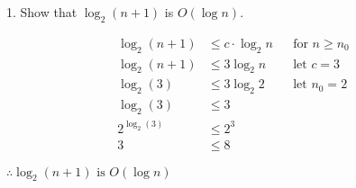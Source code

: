 \documentclass[12pt]{article}
\begin{document}
\begin{flushleft}
1. Show that $\log_{2}(n+1)$ is $O(\log n)$.
\end{flushleft}
\begin{align*}
\log_{2}(n+1)&\leq c\cdot \log_{2}n &&\text{for } n \geq n_{0}\\
\log_{2}(n+1) &\leq 3\log_{2}n &&\text{let }c=3\\
\log_{2}(3) &\leq 3\log_{2}2 &&\text{let }n_{0}=2\\
\log_{2}(3) &\leq 3\\
2^{\log_{2}(3)} &\leq 2^3\\
3 &\leq 8
\end{align*}
\begin{center}
$\therefore \log_{2}(n+1) \text{ is } O(\log n)$
\end{center}
\newpage
\end{document}
